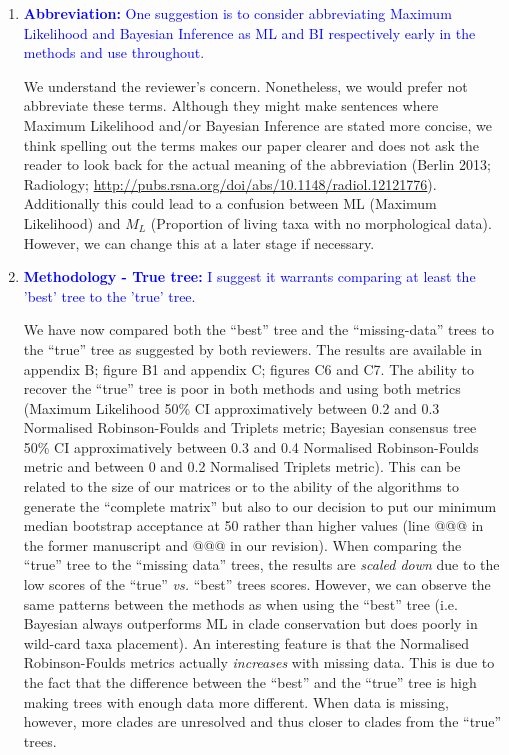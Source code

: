 \documentclass[12pt,letterpaper]{article}
\begin{document}
\begin{enumerate}
\item{\textcolor{blue}{\textbf{Abbreviation:} One suggestion is to consider abbreviating Maximum Likelihood and Bayesian Inference as ML and BI respectively early in the methods and use throughout.}}

We understand the reviewer's concern.
Nonetheless, we would prefer not abbreviate these terms. 
Although they might make sentences where Maximum Likelihood and/or Bayesian Inference are stated more concise, we think spelling out the terms makes our paper clearer and does not ask the reader to look back for the actual meaning of the abbreviation (Berlin 2013; Radiology; \url{http://pubs.rsna.org/doi/abs/10.1148/radiol.12121776}).
Additionally this could lead to a confusion between ML (Maximum Likelihood) and $M_L$ (Proportion of living taxa with no morphological data).
However, we can change this at a later stage if necessary.


\item{\textcolor{blue}{\textbf{Methodology - True tree:} I suggest it warrants comparing at least the 'best' tree to the 'true' tree.}}

We have now compared both the ``best'' tree and the ``missing-data'' trees to the ``true'' tree as suggested by both reviewers.
The results are available in appendix B; figure B1 and appendix C; figures C6 and C7.
The ability to recover the ``true'' tree is poor in both methods and using both metrics (Maximum Likelihood 50\% CI approximatively between 0.2 and 0.3 Normalised Robinson-Foulds and Triplets metric; Bayesian consensus tree 50\% CI approximatively between 0.3 and 0.4 Normalised Robinson-Foulds metric and between 0 and 0.2 Normalised Triplets metric).
This can be related to the size of our matrices or to the ability of the algorithms to generate the ``complete matrix'' but also to our decision to put our minimum median bootstrap acceptance at 50 rather than higher values (line @@@ in the former manuscript and @@@ in our revision).
When comparing the ``true'' tree to the ``missing data'' trees, the results are \textit{scaled down} due to the low scores of the ``true'' \textit{vs.} ``best'' trees scores.
However, we can observe the same patterns between the methods as when using the ``best'' tree (i.e. Bayesian always outperforms ML in clade conservation but does poorly in wild-card taxa placement).
An interesting feature is that the Normalised Robinson-Foulds metrics actually \textit{increases} with missing data.
This is due to the fact that the difference between the ``best'' and the ``true'' tree is high making trees with enough data more different.
When data is missing, however, more clades are unresolved and thus closer to clades from the ``true'' trees.


\end{enumerate}
\end{document}

